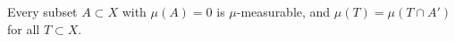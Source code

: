 Every subset $A \subset X$ with $\mu(A) = 0$ is $\mu$-measurable, and $\mu(T) = \mu(T \cap A')$ for all $T \subset X$.
